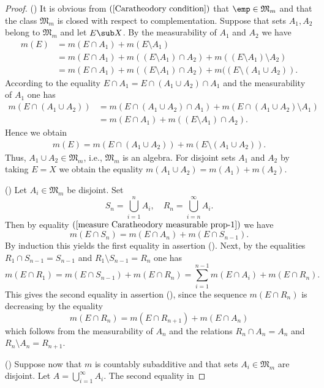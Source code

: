 \begin{proof}
() It is obvious from $(\ref{Caratheodory condition})$ that $\emp\in\mathfrak{M}_m$ and that the class $\mathfrak{M}_m$ is closed with respect to complementation. Suppose that sets $A_1,A_2$ belong to $\mathfrak{M}_m$ and let $E\sub X$. By the measurability of $A_1$ and $A_2$ we have
\begin{align*}
m(E)&=m(E\cap A_1)+m(E\setminus A_1)\\
&=m(E\cap A_1)+m((E\setminus A_1)\cap A_2)+m((E\setminus A_1)\setminus A_2)\\
&=m(E\cap A_1)+m((E\setminus A_1)\cap A_2)+m((E\setminus (A_1\cup A_2)).
\end{align*}
According to the equality $E\cap A_1=E\cap(A_1\cup A_2)\cap A_1$ and the measurability of $A_1$ one has
\begin{equation}\label{measure Caratheodory measurable prop-1}
\begin{aligned}
m(E\cap(A_1\cup A_2))&=m(E\cap(A_1\cup A_2)\cap A_1)+m(E\cap(A_1\cup A_2)\setminus A_1)\\
&=m(E\cap A_1)+m((E\setminus A_1)\cap A_2).
\end{aligned}
\end{equation}
Hence we obtain
\begin{align*}
m(E)=m(E\cap(A_1\cup A_2))+m(E\setminus(A_1\cup A_2)).
\end{align*}
Thus, $A_1\cup A_2\in\mathfrak{M}_m$, i.e., $\mathfrak{M}_m$ is an algebra. For disjoint sets $A_1$ and $A_2$ by taking $E=X$ we obtain the equality $m(A_1\cup A_2)=m(A_1)+m(A_2)$.\par
() Let $A_i\in\mathfrak{M}_m$ be disjoint. Set
\[S_n=\bigcup_{i=1}^{n}A_i,\quad R_n=\bigcup_{i=n}^{\infty}A_i.\]
Then by equality $(\ref{measure Caratheodory measurable prop-1})$ we have
\[m(E\cap S_n)=m(E\cap A_n)+m(E\cap S_{n-1}).\]
By induction this yields the first equality in assertion (). Next, by the equalities $R_1\cap S_{n-1}=S_{n-1}$ and $R_1\setminus S_{n-1}=R_n$ one has
\[m(E\cap R_1)=m(E\cap S_{n-1})+m(E\cap R_n)=\sum_{i=1}^{n-1}m(E\cap A_i)+m(E\cap R_n).\]
This gives the second equality in assertion (), since the sequence $m(E\cap R_n)$ is decreasing by the equality
\[m(E\cap R_n)=m(E\cap R_{n+1})+m(E\cap A_n)\]
which follows from the measurability of $A_n$ and the relations $R_n\cap A_n=A_n$ and $R_n\setminus A_n=R_{n+1}$.\par
() Suppose now that $m$ is countably subadditive and that sets $A_i\in\mathfrak{M}_m$ are disjoint. Let $A=\bigcup_{i=1}^{\infty}A_i$. The second equality in 

\end{proof}
